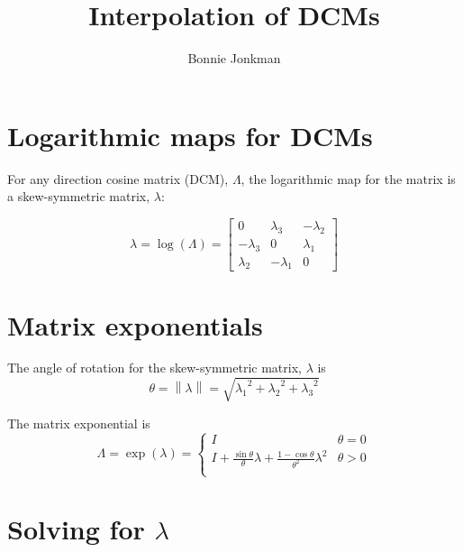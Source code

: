 \documentclass[10pt,letterpaper,oneside,notitlepage]{article}
\begin{document}
\title{Interpolation of DCMs}
\author{Bonnie Jonkman}
\maketitle


\section{Logarithmic maps for DCMs}

For any direction cosine matrix (DCM), $\Lambda$, 
the logarithmic map for the matrix is a skew-symmetric matrix, $\lambda$:


\begin{equation}
\label{EqLog}
\lambda 
= \log( \Lambda )
= \begin{bmatrix}
		0          &  \lambda_3 & -\lambda_2 \\
		-\lambda_3 &  0         &  \lambda_1 \\	
		 \lambda_2 & -\lambda_1 &  0          
	\end{bmatrix}
\end{equation}

\section{Matrix exponentials}

The angle of rotation for the skew-symmetric matrix, $\lambda$ is
\begin{equation}
\label{EqRotationAng}
\theta = \left\|\lambda\right\| = \sqrt{{\lambda_1}^2+{\lambda_2}^2+{\lambda_3}^2} 
\end{equation}

The matrix exponential is 
\begin{equation}
\label{EqExp}
 \Lambda = \exp(\lambda) =
 \left\{ 
 \begin{matrix}
	I                                                                              &  \theta = 0 \\
	I + \frac{\sin\theta}{\theta}\lambda + \frac{1-\cos\theta}{\theta^2}\lambda^2  &  \theta > 0 \\
 \end{matrix} 
 \right.
\end{equation}


\section{Solving for $\lambda$}
\end{document}
